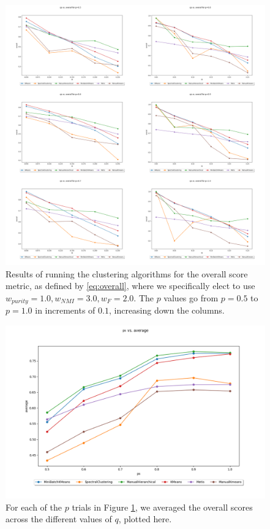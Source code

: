 \documentclass{article}
\begin{document}
\begin{figure}[H]
    \label{fig:results_overall}
    \centering
    \includegraphics[width=1.15\textwidth]{results/results_overall.png}
    \caption[Clustering overall score results]{Results of running the clustering algorithms for the overall score metric, as defined by \ref{eq:overall}, where we specifically elect to use $w_{purity}=1.0, w_{NMI}=3.0,w_{F}=2.0$. The $p$ values go from $p=0.5$ to $p=1.0$ in increments of $0.1$, increasing down the columns.}
\end{figure}

\begin{figure}[H]
    \label{fig:results_average}
    \centering
    \includegraphics[width=1.0\textwidth]{results/results_average.png}
    \caption[Clustering average overall score across $p$]{For each of the $p$ trials in Figure \ref{fig:results_overall}, we averaged the overall scores across the different values of $q$, plotted here.}
\end{figure}
\end{document}
